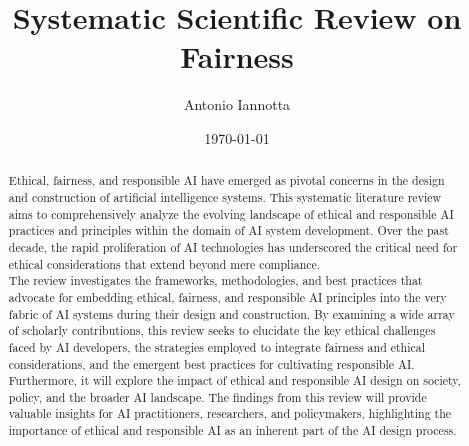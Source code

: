 \documentclass{article}
\title{Systematic Scientific Review on Fairness}
\author{Antonio Iannotta}
\date{\today}
\begin{document}
\maketitle

\begin{abstract}
    Ethical, fairness, and responsible AI have emerged as pivotal concerns in the design and construction of artificial intelligence systems. This systematic literature review aims to comprehensively analyze the evolving landscape of ethical and responsible AI practices and principles within the domain of AI system development. Over the past decade, the rapid proliferation of AI technologies has underscored the critical need for ethical considerations that extend beyond mere compliance. \\
    The review investigates the frameworks, methodologies, and best practices that advocate for embedding ethical, fairness, and responsible AI principles into the very fabric of AI systems during their design and construction. By examining a wide array of scholarly contributions, this review seeks to elucidate the key ethical challenges faced by AI developers, the strategies employed to integrate fairness and ethical considerations, and the emergent best practices for cultivating responsible AI. \\
    Furthermore, it will explore the impact of ethical and responsible AI design on society, policy, and the broader AI landscape. The findings from this review will provide valuable insights for AI practitioners, researchers, and policymakers, highlighting the importance of ethical and responsible AI as an inherent part of the AI design process.
\end{abstract}
\newpage
\end{document}
